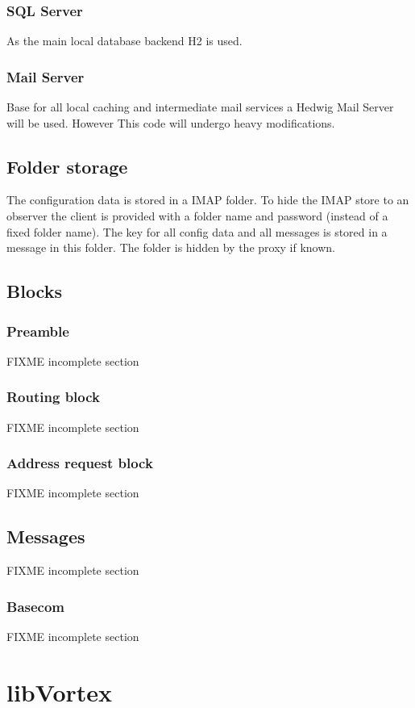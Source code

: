 \subsubsection{SQL Server}
As the main local database backend H2 is used. 

\subsubsection{Mail Server}
Base for all local caching and intermediate mail services a Hedwig Mail Server will be used. However This code will undergo heavy modifications.

\subsection{Folder storage}
The configuration data is stored in a IMAP folder. To hide the IMAP store to an observer the client is provided with a folder name and password (instead of a fixed folder name). The key for all config data and all messages is stored in a message in this folder. The folder is hidden by the proxy if known.

\subsection{Blocks}
\subsubsection{Preamble}
FIXME incomplete section

\subsubsection{Routing block}
FIXME incomplete section

\subsubsection{Address request block}
FIXME incomplete section

\subsection{Messages}
FIXME incomplete section

\subsubsection{Basecom}
FIXME incomplete section

\section{libVortex}